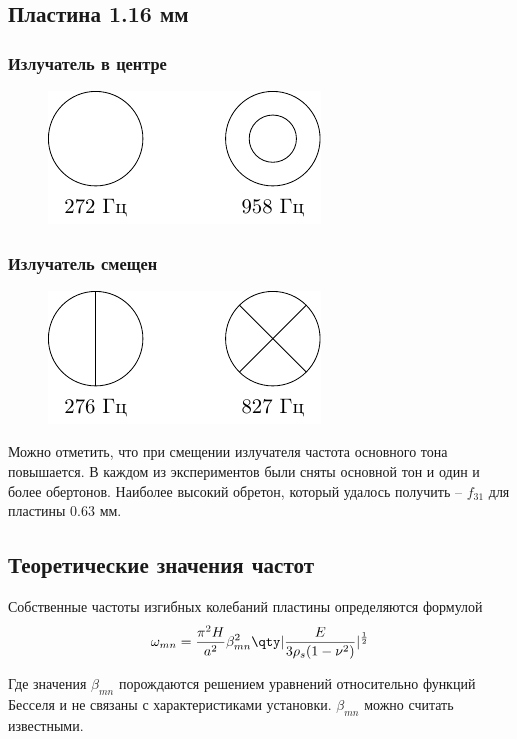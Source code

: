 \subsection{Пластина 1.16 мм}
\subsubsection{Излучатель в центре}
\begin{figure}[H]
	\centering
	\includegraphics[scale=1.5]{fig/116_c.pdf}
\end{figure}
\subsubsection{Излучатель смещен}
\begin{figure}[H]
	\centering
	\includegraphics[scale=1.5]{fig/116_b.pdf}
\end{figure}

Можно отметить, что при смещении излучателя частота основного тона повышается. В каждом из экспериментов были сняты основной тон и один и более обертонов. Наиболее высокий обретон, который удалось получить -- $f_{31}$ для пластины 0.63 мм.

\subsection{Теоретические значения частот}
Собственные частоты изгибных колебаний пластины определяются формулой
\begin{equation}
	\omega_{mn} = \frac{\pi^2 H}{a^2}\beta_{mn}^2 \qty|\frac{E}{3\rho_s (1-\nu^2)}|^{\frac12}
\end{equation}

Где значения $\beta_{mn}$ порождаются решением уравнений относительно функций Бесселя и не связаны с характеристиками установки. $\beta_{mn}$ можно считать известными.

